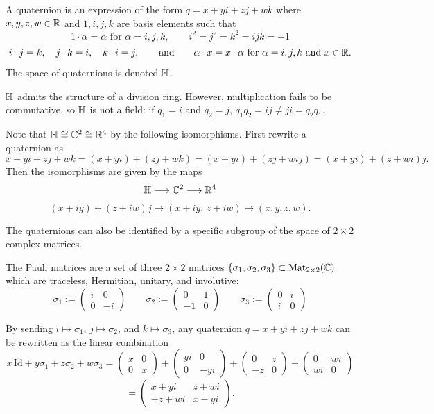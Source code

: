 \documentclass[main]{subfiles}
\begin{document}
\begin{definition}
A quaternion is an expression of the form $q=x+yi+zj+wk$ where $x,y,z,w\in\mathbb R$ and $1,i,j,k$ are basis elements such that
\[
1\cdot\alpha = \alpha \text{ for } \alpha=i,j,k, \qquad i^2=j^2=k^2=ijk=-1
\]
\[
i\cdot j = k,\quad j\cdot k = i,\quad k\cdot i = j, \qquad \text{and} \qquad \alpha\cdot x = x\cdot\alpha \text{ for } \alpha=i,j,k \text{ and } x\in\mathbb R.
\]
The space of quaternions is denoted $\mathbb H$.
\end{definition}

\begin{remark}
$\mathbb H$ admits the structure of a division ring. However, multiplication fails to be commutative, so $\mathbb H$ is not a field: if $q_1=i$ and $q_2=j$, $q_1q_2 = ij \neq ji = q_2q_1$.
\end{remark}

Note that $\mathbb H\cong\mathbb C^2\cong\mathbb R^4$ by the following isomorphisms. First rewrite a quaternion as
\[
x+yi+zj+wk = (x+yi)+(zj+wk) = (x+yi)+(zj+wij) = (x+yi)+(z+wi)j.
\]
Then the isomorphisms are given by the maps
\[
\mathbb H \longrightarrow \mathbb C^2 \longrightarrow \mathbb R^4
\]
\[
(x+iy)+(z+iw)j \longmapsto (x+iy,\,z+iw) \longmapsto (x,y,z,w).
\]

The quaternions can also be identified by a specific subgroup of the space of $2\times 2$ complex matrices.

\begin{definition}
The Pauli matrices are a set of three $2\times 2$ matrices $\{\sigma_1,\sigma_2,\sigma_3\}\subset \operatorname{Mat}_{2\times 2}(\mathbb C)$ which are traceless, Hermitian, unitary, and involutive:
\[
\sigma_1 := \begin{pmatrix} i & 0 \\ 0 & -i\end{pmatrix} \qquad \sigma_2 := \begin{pmatrix} 0 & 1 \\ -1 & 0\end{pmatrix} \qquad \sigma_3 := \begin{pmatrix} 0 & i \\ i & 0\end{pmatrix}
\]
\end{definition}

By sending $i\mapsto\sigma_1$, $j\mapsto\sigma_2$, and $k\mapsto\sigma_3$, any quaternion $q=x+yi+zj+wk$ can be rewritten as the linear combination
\[
x\,\mathrm{Id}+y\sigma_1+z\sigma_2+w\sigma_3 = \begin{pmatrix} x & 0 \\ 0 & x\end{pmatrix} + \begin{pmatrix} yi & 0 \\ 0 & -yi\end{pmatrix} + \begin{pmatrix} 0 & z \\ -z & 0\end{pmatrix} + \begin{pmatrix} 0 & wi \\ wi & 0\end{pmatrix}
\]
\[
= \begin{pmatrix} x+yi & z+wi \\ -z+wi & x-yi\end{pmatrix}.
\]
\end{document}
